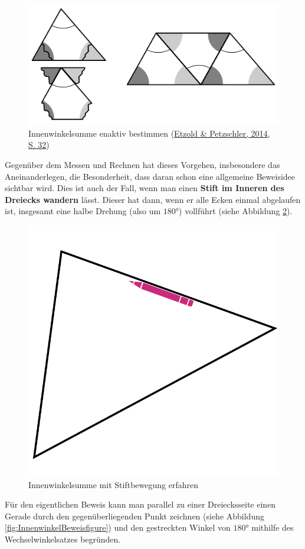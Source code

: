 \documentclass[
]{scrbook}
\theoremstyle{definition}
\theoremstyle{definition}
\theoremstyle{definition}
\theoremstyle{definition}
\theoremstyle{remark}
\begin{document}
\begin{figure}

{\centering \includegraphics[width=0.75\linewidth]{pictures/12-InnenwinkelReissen} 

}

\caption{Innenwinkelsumme enaktiv bestimmen (\protect\hyperlink{ref-Etzold2014a}{Etzold \& Petzschler, 2014, S. 32})}\label{fig:InnenwinkelReissen}
\end{figure}

Gegenüber dem Messen und Rechnen hat dieses Vorgehen, insbesondere das Aneinanderlegen, die Besonderheit, dass daran schon eine allgemeine Beweisidee sichtbar wird. Dies ist auch der Fall, wenn man einen \textbf{Stift im Inneren des Dreiecks wandern} lässt. Dieser hat dann, wenn er alle Ecken einmal abgelaufen ist, insgesamt eine halbe Drehung (also um \(180°\)) vollführt (siehe Abbildung \ref{fig:InnenwinkelStift}).

\begin{figure}

{\centering \includegraphics[width=0.5\linewidth]{pictures/12-InnenwinkelStift} 

}

\caption{Innenwinkelsumme mit Stiftbewegung erfahren}\label{fig:InnenwinkelStift}
\end{figure}

Für den eigentlichen Beweis kann man parallel zu einer Dreiecksseite einen Gerade durch den gegenüberliegenden Punkt zeichnen (siehe Abbildung \ref{fig:InnenwinkelBeweisfigure}) und den gestreckten Winkel von \(180°\) mithilfe des Wechselwinkelsatzes begründen.
\end{document}

